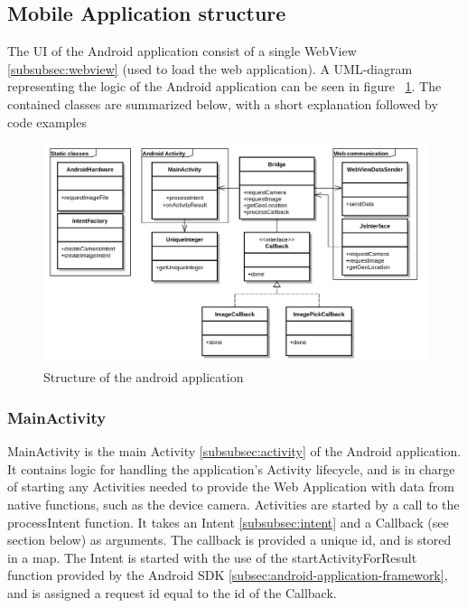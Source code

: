 \subsection{Mobile Application structure} \label{subsec:mobile-application-structure-native}
The UI of the Android application consist of a single WebView \ref{subsubsec:webview} (used to load the web application). A UML-diagram representing the logic of the Android application can be seen in figure ~\ref{fig:nativeuml}. The contained classes are summarized below, with a short explanation followed by code examples 

\begin{figure}[h!]
	\centering
    \includegraphics[width=150mm,natwidth=1000,natheight=750]{./img/polluxuml.png}
    \caption{Structure of the android application}
    \label{fig:nativeuml}
\end{figure}

\subsubsection{MainActivity} 
MainActivity is the main Activity \ref{subsubsec:activity} of the Android application. It contains logic for handling the application's Activity lifecycle, and is in charge of starting any Activities needed to provide the Web Application with data from native functions, such as the device camera. Activities are started by a call to the processIntent function. It takes an Intent \ref{subsubsec:intent} and a Callback (see section below) as arguments. The callback is provided a unique id, and is stored in a map. The Intent is started with the use of the startActivityForResult function provided by the Android SDK \ref{subsec:android-application-framework}, and is assigned a request id equal to the id of the Callback. 
\\\\
	
